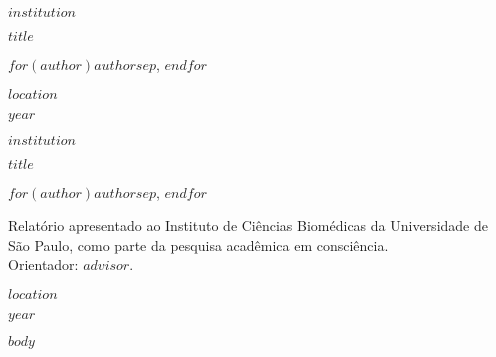 \documentclass[12pt]{report}
\newcommand{\ABNTTitle}{$title$}
\newcommand{\ABNTAuthor}{$for(author)$$author$$sep$, $endfor$}
\newcommand{\ABNTAdvisor}{$advisor$}
\newcommand{\ABNTInstit}{$institution$}
\newcommand{\ABNTCity}{$location$}
\newcommand{\ABNTYear}{$year$}
\begin{document}
\thispagestyle{empty}
\begin{center}
{\large \textbf{\ABNTInstit}\par}
\vfill
{\LARGE \textbf{\ABNTTitle}\par}
\vfill
{\large \ABNTAuthor\par}
\vfill
{\large \ABNTCity\par}
{\large \ABNTYear\par}
\end{center}
\clearpage

\thispagestyle{empty}
\begin{center}
{\large \textbf{\ABNTInstit}\par}
\vfill
{\LARGE \textbf{\ABNTTitle}\par}
\vspace{1.5em}
{\large \ABNTAuthor\par}
\vspace{2em}
\begin{minipage}{0.75\textwidth}
\noindent Relatório apresentado ao Instituto de Ciências Biomédicas da Universidade de São Paulo, como parte da pesquisa acadêmica em consciência.\\
\noindent Orientador: \ABNTAdvisor.
\end{minipage}
\vfill
{\large \ABNTCity\par}
{\large \ABNTYear\par}
\end{center}
\clearpage

\tableofcontents
\clearpage

\setcounter{page}{1}
$body$
\end{document}
